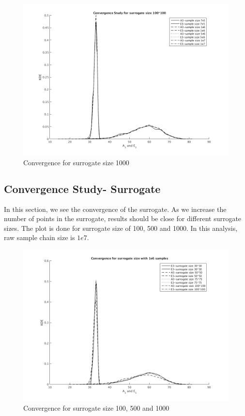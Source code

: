 \begin{figure}[H]
\centering
\includegraphics[scale = 0.7]{model_3/sample_conv} 
    \caption{Convergence for surrogate size 1000}
\end{figure}


\subsection{Convergence Study- Surrogate }

 In this section, we see the convergence of the surrogate. As we increase the number of points in the surrogate, results should be close for different surrogate sizes. The plot is done for surrogate size of 100, 500 and 1000. In this analysis, raw sample chain size is $1e7$. 

\begin{figure}[H]
\centering
\includegraphics[scale=0.7]{model_3/surrogate_conv} 
    \caption{Convergence for surrogate size 100, 500 and 1000}
\end{figure}



